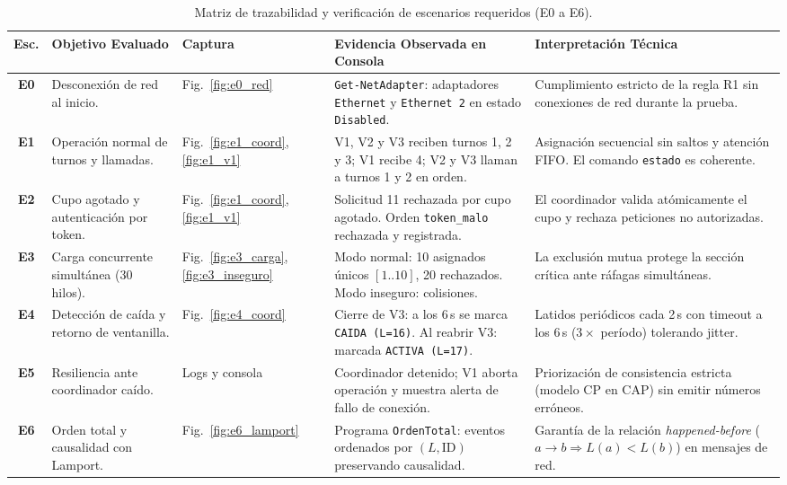 \documentclass[10pt,a4paper]{article}
\begin{document}
\vspace{-0.1cm}
\begin{table}[!ht]
\centering
\scriptsize
\renewcommand{\arraystretch}{0.92}
\begin{tabularx}{\textwidth}{c p{3.1cm} p{1.3cm} p{5.1cm} X}
\toprule
\textbf{Esc.} & \textbf{Objetivo Evaluado} & \textbf{Captura} & \textbf{Evidencia Observada en Consola} & \textbf{Interpretación Técnica} \\
\midrule
\textbf{E0} & Desconexión de red al inicio. & Fig.~\ref{fig:e0_red} & \texttt{Get-NetAdapter}: adaptadores \texttt{Ethernet} y \texttt{Ethernet 2} en estado \texttt{Disabled}. & Cumplimiento estricto de la regla R1 sin conexiones de red durante la prueba. \\
\textbf{E1} & Operación normal de turnos y llamadas. & Fig.~\ref{fig:e1_coord}, \ref{fig:e1_v1} & V1, V2 y V3 reciben turnos 1, 2 y 3; V1 recibe 4; V2 y V3 llaman a turnos 1 y 2 en orden. & Asignación secuencial sin saltos y atención FIFO. El comando \texttt{estado} es coherente. \\
\textbf{E2} & Cupo agotado y autenticación por token. & Fig.~\ref{fig:e1_coord}, \ref{fig:e1_v1} & Solicitud 11 rechazada por cupo agotado. Orden \texttt{token\_malo} rechazada y registrada. & El coordinador valida atómicamente el cupo y rechaza peticiones no autorizadas. \\
\textbf{E3} & Carga concurrente simultánea (30 hilos). & Fig.~\ref{fig:e3_carga}, \ref{fig:e3_inseguro} & Modo normal: 10 asignados únicos $[1..10]$, 20 rechazados. Modo inseguro: colisiones. & La exclusión mutua protege la sección crítica ante ráfagas simultáneas. \\
\textbf{E4} & Detección de caída y retorno de ventanilla. & Fig.~\ref{fig:e4_coord} & Cierre de V3: a los 6\,s se marca \texttt{CAIDA (L=16)}. Al reabrir V3: marcada \texttt{ACTIVA (L=17)}. & Latidos periódicos cada 2\,s con timeout a los 6\,s ($3 \times$ período) tolerando jitter. \\
\textbf{E5} & Resiliencia ante coordinador caído. & Logs y consola & Coordinador detenido; V1 aborta operación y muestra alerta de fallo de conexión. & Priorización de consistencia estricta (modelo CP en CAP) sin emitir números erróneos. \\
\textbf{E6} & Orden total y causalidad con Lamport. & Fig.~\ref{fig:e6_lamport} & Programa \texttt{OrdenTotal}: eventos ordenados por $(L, \text{ID})$ preservando causalidad. & Garantía de la relación \textit{happened-before} ($a \to b \Rightarrow L(a) < L(b)$) en mensajes de red. \\
\bottomrule
\end{tabularx}
\caption{Matriz de trazabilidad y verificación de escenarios requeridos (E0 a E6).}
\label{tab:matriz_escenarios}
\end{table}
\vspace{-0.25cm}
\end{document}
